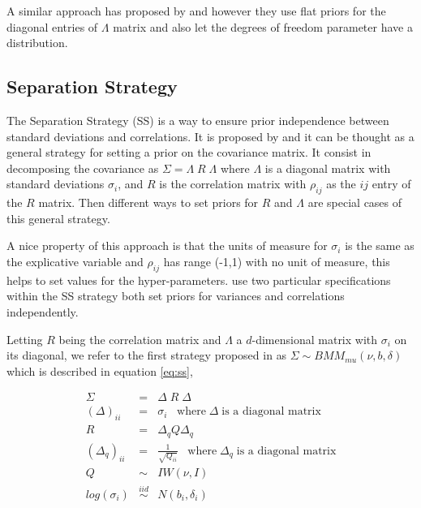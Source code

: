 \documentclass{article}
\begin{document}
A similar approach has proposed by \cite{daniels1999} and \cite{matilde} however they use flat priors for the diagonal entries of $\Lambda$ matrix and also let the degrees of freedom parameter have a distribution.
 
\subsection{Separation Strategy \label{ss.sec} }

The Separation Strategy (SS) is a way to ensure prior independence between standard deviations and correlations. It is proposed by \cite{barnard2000} and it can be thought as a general strategy for setting a prior on the covariance matrix. It consist in decomposing the covariance as $\Sigma = \Lambda \; R \; \Lambda$  where $\Lambda$ is a diagonal matrix with  standard deviations $\sigma_{i}$, and $R$ is the correlation matrix with $\rho_{ij}$  as the $ij$ entry of the $R$ matrix. Then different ways to set priors for $R$ and $\Lambda$ are special cases of this general strategy. 

A nice property of this approach is that the units of measure for $\sigma_i$ is the same as the explicative variable and $\rho_{ij}$ has range (-1,1) with no unit of measure, this helps to set values for the hyper-parameters. \cite{barnard2000} use two particular specifications within the SS strategy both set priors for variances and correlations independently.

Letting $R$ being the correlation matrix and $\Lambda$ a $d$-dimensional matrix with $\sigma_{i}$ on its diagonal, we refer to the first strategy proposed in \cite{barnard2000} as $\Sigma \sim BMM_{mu}(\nu,b,\delta)$ which is described in equation \ref{eq:ss},  

\begin{eqnarray}
\nonumber \Sigma &=& \Delta \; R \; \Delta \\ 
\nonumber  (\Delta)_{ii} &=& \sigma_i \;\; \; \mbox{where} \; \Delta \; \mbox{is a diagonal matrix} \\
\nonumber R &=& \Delta_q Q \Delta_q \\
\nonumber  (\Delta_q)_{ii} &=& \frac{1}{\sqrt{Q_{ii}}} \;\; \; \mbox{where} \; \Delta_q \; \mbox{is a diagonal matrix} \\
\nonumber Q &\sim& IW(\nu, I )\\ 
log(\sigma_i) &\stackrel{iid} \sim& N(b_i, \delta_i)
\label{eq:ss}
\end{eqnarray} 
\end{document}
